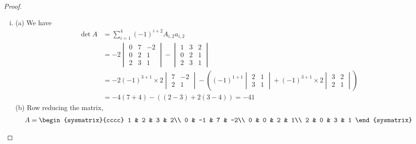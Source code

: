 \begin{proof}
    \renewcommand{\qedsymbol}{$\blacksquare$}
    \begin{enumerate}[(i)]
        \item (a) We have 
        \[
            \begin{aligned}
                \det A
                &=\sum_{i=1}^{4}(-1)^{i+2}A_{i,2}a_{i,2}\\
                &=-2\begin{vmatrix}
                    0 & 7 & -2\\
                    0 & 2 & 1\\
                    2 & 3 & 1
                \end{vmatrix}
                -\begin{vmatrix}
                    1 & 3 & 2\\
                    0 & 2 & 1\\
                    2 & 3 & 1
                \end{vmatrix}\\
                &=-2(-1)^{3+1}\times 2\begin{vmatrix}
                    7 & -2\\
                    2 & 1
                \end{vmatrix}
                -\left((-1)^{1+1}\begin{vmatrix}
                    2 & 1\\
                    3 & 1
                \end{vmatrix}+(-1)^{3+1}\times 2\begin{vmatrix}
                    3 & 2\\
                    2 & 1
                \end{vmatrix}\right)\\
                &=-4(7+4)-((2-3)+2(3-4))=-41
            \end{aligned}
        \]
        (b) Row reducing the matrix,
        \begin{alignat*}{2}
            A=\begin{sysmatrix}{cccc}
                1 & 2 & 3 & 2\\
                0 & -1 & 7 & -2\\
                0 & 0 & 2 & 1\\
                2 & 0 & 3 & 1
            \end{sysmatrix}
            \begin{aligned}

\end{aligned}
\end{alignat*}
\end{enumerate}
\end{proof}
